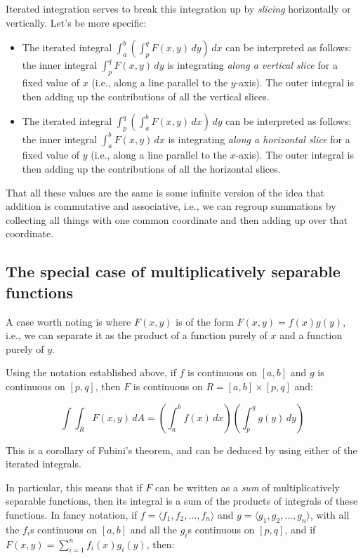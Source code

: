 \documentclass[10pt]{amsart}
\begin{document}
Iterated integration serves to break this integration up by {\em
slicing} horizontally or vertically. Let's be more specific:

\begin{itemize}
\item The iterated integral $\int_a^b \left(\int_p^q F(x,y) \,
  dy\right) \, dx$ can be interpreted as follows: the inner integral
  $\int_p^q F(x,y) \, dy$ is integrating {\em along a vertical slice}
  for a fixed value of $x$ (i.e., along a line parallel to the
  $y$-axis). The outer integral is then adding up the contributions of
  all the vertical slices.
\item The iterated integral $\int_p^q \left(\int_a^b F(x,y) \,
  dx\right) \, dy$ can be interpreted as follows: the inner integral
  $\int_a^b F(x,y) \, dx$ is integrating {\em along a horizontal
  slice} for a fixed value of $y$ (i.e., along a line parallel to the
  $x$-axis). The outer integral is then adding up the contributions of
  all the horizontal slices.
\end{itemize}

That all these values are the same is some infinite version of the
idea that addition is commutative and associative, i.e., we can
regroup summations by collecting all things with one common coordinate
and then adding up over that coordinate.

\subsection{The special case of multiplicatively separable functions}

A case worth noting is where $F(x,y)$ is of the form $F(x,y) =
f(x)g(y)$, i.e., we can separate it as the product of a function
purely of $x$ and a function purely of $y$.

Using the notation established above, if $f$ is continuous on $[a,b]$
and $g$ is continuous on $[p,q]$, then $F$ is continuous on $R = [a,b]
\times [p,q]$ and:

$$\int \int_R F(x,y) \, dA = \left(\int_a^b f(x) \, dx \right) \left(\int_p^q g(y) \, dy \right)$$

This is a corollary of Fubini's theorem, and can be deduced by using
either of the iterated integrals.

In particular, this means that if $F$ can be written as a {\em sum} of
multiplicatively separable functions, then its integral is a sum of
the products of integrals of these functions. In fancy notation, if $f
= \langle f_1, f_2, \dots, f_n \rangle$ and $g = \langle
g_1,g_2,\dots, g_n \rangle$, with all the $f_i$s continuous on $[a,b]$
and all the $g_i$s continuous on $[p,q]$, and if $F(x,y) =
\sum_{i=1}^n f_i(x)g_i(y)$, then:
\end{document}
